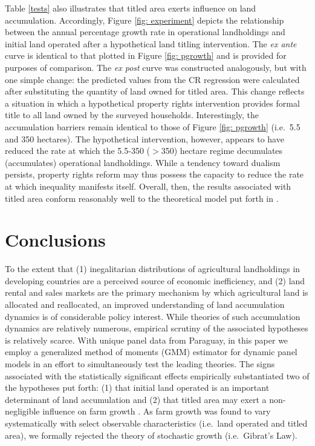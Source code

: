 \documentclass[english]{article}
\begin{document}
Table \ref{tests} also illustrates that titled area exerts influence on land
accumulation. 
Accordingly, Figure \ref{fig: experiment} depicts the relationship between 
the annual percentage growth rate in operational landholdings and initial land 
operated after a hypothetical land titling intervention.
The \emph{ex ante} curve is identical to that plotted in Figure 
\ref{fig: pgrowth} and is provided for purposes of comparison.
The \emph{ex post} curve was constructed analogously, but with one
simple change: the predicted values from the CR regression were calculated
after substituting the quantity of land owned for titled area.
This change reflects a situation in which a hypothetical property rights 
intervention provides formal title to all land owned by the surveyed
households.
Interestingly, the accumulation barriers remain identical to those of Figure
\ref{fig: pgrowth} (i.e.\ 5.5 and 350 hectares).
The hypothetical intervention, however, appears to have reduced the rate at
which the 5.5-350 ($>$350) hectare regime decumulates (accumulates) 
operational landholdings.
While a tendency toward dualism persists, property rights reform may 
thus possess the capacity to reduce the rate at which inequality 
manifests itself. 
Overall, then, the results associated with titled area conform reasonably well 
to the theoretical model put forth in \citet{carter1998b}.


\section{Conclusions}
\label{sec: conclusions}

To the extent that (1) inegalitarian distributions of agricultural landholdings in 
developing countries are a perceived source of economic inefficiency, and 
(2) land rental and sales markets are the primary mechanism by which 
agricultural land is allocated and reallocated, an improved understanding of 
land accumulation dynamics is of considerable policy interest.
While theories of such accumulation dynamics are relatively numerous, 
empirical scrutiny of the associated hypotheses is relatively scarce.
With unique panel data from Paraguay, in this paper we employ a 
generalized method of moments (GMM) estimator for dynamic panel 
models in an effort to simultaneously test the leading theories.
The signs associated with the statistically significant effects 
empirically substantiated two of the hypotheses put forth: (1) that initial land 
operated is an important determinant of land accumulation 
\citep{carter1993} and (2) that titled area may exert a non-negligible 
influence on farm growth \citep{carter1998b}.
As farm growth was found to vary systematically with select observable 
characteristics (i.e.\ land operated and titled area), we formally rejected
the theory of stochastic growth (i.e.\ Gibrat's Law).
\end{document}
